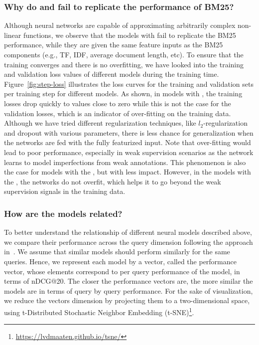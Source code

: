 \subsubsection{Why do \feedone and \feedtwo fail to replicate the performance of BM25?}
%
Although neural networks are capable of approximating arbitrarily complex non-linear functions, we observe that the models with \feedone fail to replicate the BM25 performance, while they are given the same feature inputs as the BM25 components (e.g., TF, IDF, average document length, etc). To ensure that the training converges and there is no overfitting, we have looked into the training and validation loss values of different models during the training time. Figure~\ref{fig:step-loss} illustrates the loss curves for the training and validation sets per training step for different models.
%
As shown, in models with \feedone, the training losses drop quickly to values close to zero while this is not the case for the validation losses, which is an indicator of over-fitting on the training data. 
Although we have tried different regularization techniques, like $l_2$-regularization and dropout with various parameters, there is less chance for generalization when the networks are fed with the fully featurized input. Note that over-fitting would lead to poor performance, especially in weak supervision scenarios as the network learns to model imperfections from weak annotations. 
%
This phenomenon is also the case for models with the \feedtwo, but with less impact. However, in the models with the \feedthree, the networks do not overfit, which helps it to go beyond the weak supervision signals in the training data.


\subsubsection{How are the models related?}
%
To better understand the relationship of different neural models described above, we compare their performance across the query dimension following the approach in~\citep{Mitra:2016}. 
We assume that similar models should perform similarly for the same queries. Hence, we represent each model by a vector, called the performance vector, whose elements correspond to per query performance of the model, in terms of nDCG@20. The closer the performance vectors are, the more similar the models are in terms of query by query performance. For the sake of visualization, we reduce the vectors dimension by projecting them to a two-dimensional space, using t-Distributed Stochastic Neighbor Embedding (t-SNE)\footnote{\url{https://lvdmaaten.github.io/tsne/}}.

